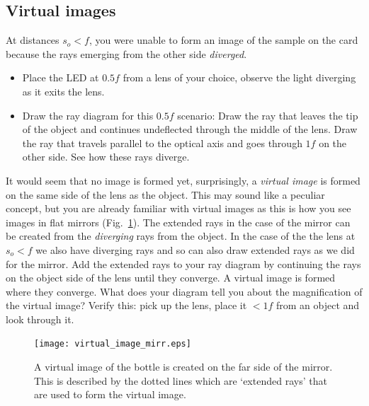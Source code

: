 \documentclass[a4paper]{report}
\newcommand{\nexercise}[0]{\arabic{exercises}\addtocounter{exercises}{1}}
\begin{document}

\clearpage

\subsection{Virtual images}
\begin{exercisebox}[frametitle={Exercise \nexercise: Virtual images}]
At distances $s_o<f$, you were unable to form an image of the sample on the card because the rays emerging from the other side \textit{diverged}.
\begin{itemize}
\item Place the LED at $0.5f$ from a lens of your choice, observe the light diverging as it exits the lens.
\item Draw the ray diagram for this $0.5f$ scenario:
Draw the ray that leaves the tip of the object and continues undeflected through the middle of the lens. 
Draw the ray that travels parallel to the optical axis and goes through $1f$ on the other side.
See how these rays diverge. 
\end{itemize}
\end{exercisebox}

It would seem that no image is formed yet, surprisingly, a \textit{virtual image} is formed on the same side of the lens as the object. 
This may sound like a peculiar concept, but you are already familiar with virtual images as this is how you see images in flat mirrors (Fig.~\ref{fig:mirror}). 
The extended rays in the case of the mirror can be created from the \textit{diverging} rays from the object. 
In the case of the the lens at $s_o<f$ we also have diverging rays and so can also draw extended rays as we did for the mirror. 
Add the extended rays to your ray diagram by continuing the rays on the object side of the lens until they converge. 
A virtual image is formed where they converge.
What does your diagram tell you about the magnification of the virtual image?
Verify this: pick up the lens, place it $<1f$ from an object and look through it.
\begin{figure}[h]
\center
\texttt{[image: virtual\_image\_mirr.eps]}
\caption{A virtual image of the bottle is created on the far side of the mirror. 
This is described by the dotted lines which are `extended rays' that are used to form the virtual image. }
\label{fig:mirror}
\end{figure}
\end{document}
